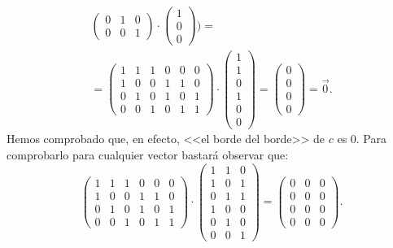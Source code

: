 \documentclass[12pt, a4paper, twoside]{book}
\numberwithin{equation}{section}
\theoremstyle{definition}
\newenvironment{ejem}
  {\pushQED{\qed}\renewcommand{\qedsymbol}{$\blacktriangleleft$}\ejemplo}
  {\popQED\endejemplo}
\theoremstyle{remark}
\theoremstyle{plain}
\begin{document}
\begin{ejem}
\begin{equation*}
\begin{split}
\begin{pmatrix}
				0 & 1 & 0 \\
				0 & 0 & 1
				\end{pmatrix}
				\cdot
				\begin{pmatrix}
				1 \\
				0 \\
				0 
				\end{pmatrix} \Bigg ) = \\
				=\begin{pmatrix}
				1 & 1 & 1 & 0 & 0 &0 \\
				1 & 0 & 0 & 1 & 1 &0 \\
				0 & 1 & 0 & 1 & 0 &1 \\
				0 & 0 & 1 & 0 & 1 &1
				\end{pmatrix}
				\cdot
				\begin{pmatrix}
				1 \\
				1 \\
				0 \\
				1 \\
				0 \\
				0
				\end{pmatrix} =
				\begin{pmatrix}
                                0 \\
				0 \\
				0 \\
				0
				\end{pmatrix}=
				\vec{0}.
			\end{split}
		\end{equation*}
		Hemos comprobado que, en efecto, <<el borde del borde>> de 
		$c$ es 0. Para comprobarlo para cualquier vector bastará 
		observar que:
		\begin{equation*}
		\begin{pmatrix}
				1 & 1 & 1 & 0 & 0 &0 \\
				1 & 0 & 0 & 1 & 1 &0 \\
				0 & 1 & 0 & 1 & 0 &1 \\
				0 & 0 & 1 & 0 & 1 &1
			\end{pmatrix}\cdot 
				\begin{pmatrix}
				1 & 1 & 0 \\
				1 & 0 & 1 \\
				0 & 1 & 1 \\
				1 & 0 & 0 \\
				0 & 1 & 0 \\
				0 & 0 & 1
				\end{pmatrix}
				=
				\begin{pmatrix}
				0 & 0 & 0 \\
				0 & 0 & 0 \\
				0 & 0 & 0 \\
				0 & 0 & 0 
				\end{pmatrix}.
		\end{equation*}
	\end{ejem}
\end{document}
